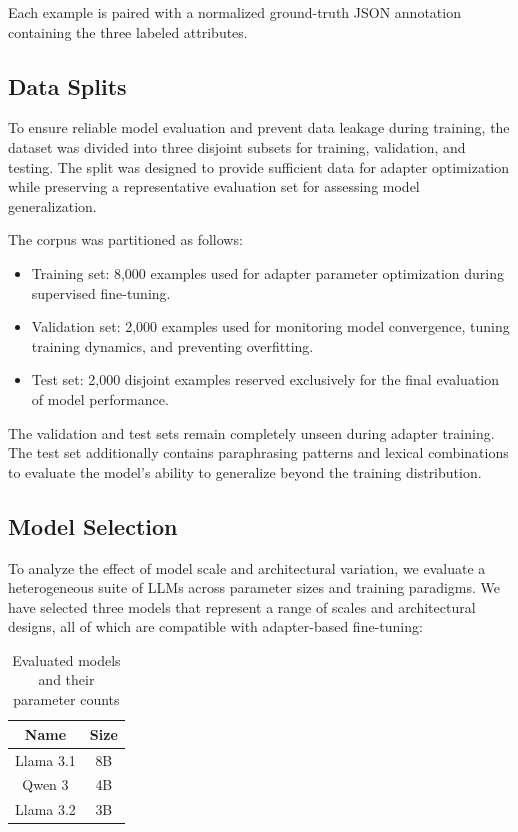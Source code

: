 \documentclass[journal,article,submit,pdftex,moreauthors]{Definitions/mdpi}
\begin{document}
Each example is paired with a normalized ground-truth JSON annotation containing the three labeled attributes.

\subsection{Data Splits}

To ensure reliable model evaluation and prevent data leakage during training, the dataset was divided into three disjoint subsets for training, validation, and testing. The split was designed to provide sufficient data for adapter optimization while preserving a representative evaluation set for assessing model generalization.

The corpus was partitioned as follows:

\begin{itemize}
    \item Training set: 8,000 examples used for adapter parameter optimization during supervised fine-tuning.
    
    \item Validation set: 2,000 examples used for monitoring model convergence, tuning training dynamics, and preventing overfitting.
    
    \item Test set: 2,000 disjoint examples reserved exclusively for the final evaluation of model performance.
\end{itemize}

The validation and test sets remain completely unseen during adapter training. The test set additionally contains paraphrasing patterns and lexical combinations to evaluate the model’s ability to generalize beyond the training distribution.



\subsection{Model Selection}

To analyze the effect of model scale and architectural variation, we evaluate a heterogeneous suite of LLMs across parameter sizes and training paradigms. We have selected three models that represent a range of scales and architectural designs, all of which are compatible with adapter-based fine-tuning:

\begin{table}[H]
\caption{Evaluated models and their parameter counts}
\label{tab:model_list}
\begin{center}
\begin{tabularx}{\textwidth}{CC}
\hline
Name & Size\\
\hline
Llama 3.1 & 8B \\
Qwen 3 & 4B \\
Llama 3.2 & 3B \\
\hline
\end{tabularx}
\end{center}
\end{table}
\end{document}
